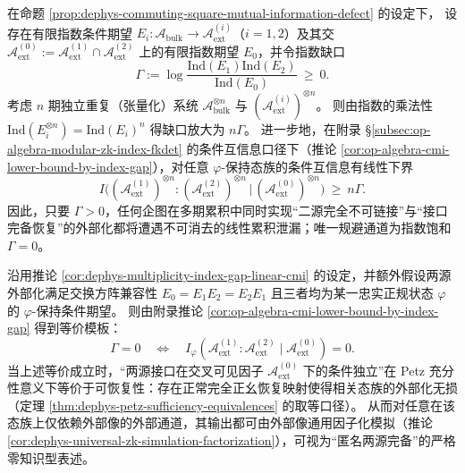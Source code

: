 \begin{corollary}\label{cor:dephys-multiplicity-index-gap-linear-cmi}
在命题 \ref{prop:dephys-commuting-square-mutual-information-defect} 的设定下，
设存在有限指数条件期望 \(E_i:\mathcal{A}_{\mathrm{bulk}}\to \mathcal{A}_{\mathrm{ext}}^{(i)}\)（\(i=1,2\)）及其交 \(\mathcal{A}_{\mathrm{ext}}^{(0)}:=\mathcal{A}_{\mathrm{ext}}^{(1)}\cap\mathcal{A}_{\mathrm{ext}}^{(2)}\) 上的有限指数期望 \(E_0\)，并令指数缺口
\[
\Gamma:=\log\frac{\mathrm{Ind}(E_1)\mathrm{Ind}(E_2)}{\mathrm{Ind}(E_0)}\ \ge\ 0.
\]
考虑 \(n\) 期独立重复（张量化）系统 \(\mathcal{A}_{\mathrm{bulk}}^{\otimes n}\) 与 \((\mathcal{A}_{\mathrm{ext}}^{(i)})^{\otimes n}\)。
则由指数的乘法性
\(
\mathrm{Ind}(E_i^{\otimes n})=\mathrm{Ind}(E_i)^n
\)
得缺口放大为 \(n\Gamma\)。
进一步地，在附录 \S\ref{subsec:op-algebra-modular-zk-index-fkdet} 的条件互信息口径下（推论 \ref{cor:op-algebra-cmi-lower-bound-by-index-gap}），对任意 \(\varphi\)-保持态族的条件互信息有线性下界
\[
\boxed{\;
I\bigl((\mathcal{A}_{\mathrm{ext}}^{(1)})^{\otimes n}:(\mathcal{A}_{\mathrm{ext}}^{(2)})^{\otimes n}\,\big|\,(\mathcal{A}_{\mathrm{ext}}^{(0)})^{\otimes n}\bigr)
\ \ge\ n\Gamma.\;}
\]
因此，只要 \(\Gamma>0\)，任何企图在多期累积中同时实现“二源完全不可链接”与“接口完备恢复”的外部化都将遭遇不可消去的线性累积泄漏；唯一规避通道为指数饱和 \(\Gamma=0\)。
\end{corollary}

\begin{corollary}\label{cor:dephys-two-source-anonymy-completeness-template}
沿用推论 \ref{cor:dephys-multiplicity-index-gap-linear-cmi} 的设定，并额外假设两源外部化满足交换方阵兼容性
\(
E_0=E_1E_2=E_2E_1
\)
且三者均为某一忠实正规状态 \(\varphi\) 的 \(\varphi\)-保持条件期望。
则由附录推论 \ref{cor:op-algebra-cmi-lower-bound-by-index-gap} 得到等价模板：
\[
\boxed{\;
\Gamma=0
\quad\Longleftrightarrow\quad
I_\varphi(\mathcal{A}^{(1)}_{\mathrm{ext}}:\mathcal{A}^{(2)}_{\mathrm{ext}}\mid\mathcal{A}^{(0)}_{\mathrm{ext}})=0.\;}
\]
当上述等价成立时，“两源接口在交叉可见因子 \(\mathcal{A}^{(0)}_{\mathrm{ext}}\) 下的条件独立”在 Petz 充分性意义下等价于可恢复性：存在正常完全正幺恢复映射使得相关态族的外部化无损（定理 \ref{thm:dephys-petz-sufficiency-equivalences} 的取等口径）。
从而对任意在该态族上仅依赖外部像的外部通道，其输出都可由外部像通用因子化模拟（推论 \ref{cor:dephys-universal-zk-simulation-factorization}），可视为“匿名两源完备”的严格零知识型表述。
\end{corollary}

